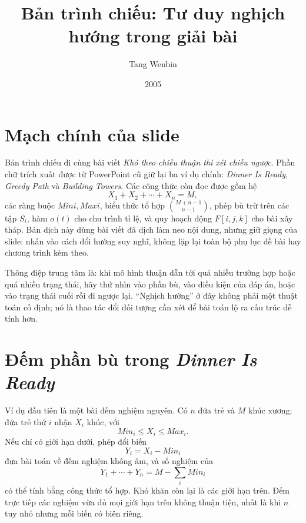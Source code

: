 \documentclass[11pt]{article}
\title{Bản trình chiếu: Tư duy nghịch hướng trong giải bài}
\author{Tang Wenbin}
\date{2005}
\begin{document}
\maketitle


\section{Mạch chính của slide}

Bản trình chiếu đi cùng bài viết \emph{Khó theo chiều thuận thì xét chiều
ngược}. Phần chữ trích xuất được từ PowerPoint cũ giữ lại ba ví dụ chính:
\textit{Dinner Is Ready}, \textit{Greedy Path} và \textit{Building Towers}.
Các công thức còn đọc được gồm hệ
\[
  X_1+X_2+\cdots+X_n=M,
\]
các ràng buộc \(\mathit{Mini},\mathit{Maxi}\), biểu thức tổ hợp
\(\binom{M+n-1}{n-1}\), phép bù trừ trên các tập \(\overline{S_i}\), hàm
\(o(t)\) cho chu trình tỉ lệ, và quy hoạch động \(F[i,j,k]\) cho bài xây
tháp. Bản dịch này dùng bài viết đã dịch làm neo nội dung, nhưng giữ giọng
của slide: nhấn vào cách đổi hướng suy nghĩ, không lặp lại toàn bộ phụ lục đề
bài hay chương trình kèm theo.

Thông điệp trung tâm là: khi mô hình thuận dẫn tới quá nhiều trường hợp hoặc
quá nhiều trạng thái, hãy thử nhìn vào phần bù, vào điều kiện của đáp án, hoặc
vào trạng thái cuối rồi đi ngược lại. ``Nghịch hướng'' ở đây không phải một
thuật toán cố định; nó là thao tác đổi đối tượng cần xét để bài toán lộ ra
cấu trúc dễ tính hơn.

\section{Đếm phần bù trong \textit{Dinner Is Ready}}

Ví dụ đầu tiên là một bài đếm nghiệm nguyên. Có \(n\) đứa trẻ và \(M\) khúc
xương; đứa trẻ thứ \(i\) nhận \(X_i\) khúc, với
\[
  \mathit{Min}_i\le X_i\le \mathit{Max}_i.
\]
Nếu chỉ có giới hạn dưới, phép đổi biến
\[
  Y_i=X_i-\mathit{Min}_i
\]
đưa bài toán về đếm nghiệm không âm, và số nghiệm của
\[
  Y_1+\cdots+Y_n=M-\sum_i\mathit{Min}_i
\]
có thể tính bằng công thức tổ hợp. Khó khăn còn lại là các giới hạn trên.
Đếm trực tiếp các nghiệm vừa đủ mọi giới hạn trên không thuận tiện, nhất là
khi \(n\) tuy nhỏ nhưng mỗi biến có biên riêng.
\end{document}
